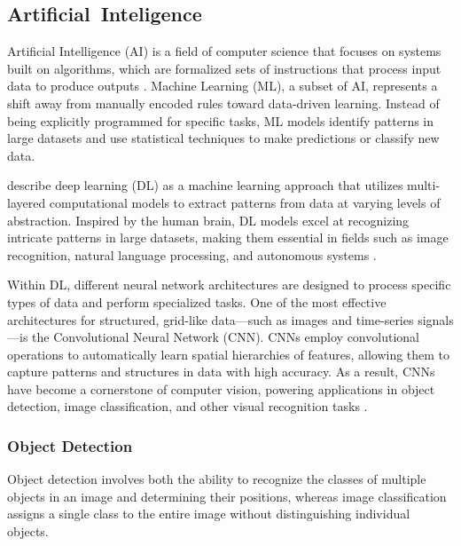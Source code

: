 \documentclass[a4paper,10pt,twocolumn]{article}
\numberwithin{figure}{section}
\numberwithin{table}{section}
\begin{document}

\subsection{\mbox{Artificial Inteligence}}
Artificial Intelligence (AI) is a field of computer science 
that focuses on systems built on algorithms, 
which are formalized sets of instructions that 
process input data to produce outputs \citep{10589380}. 
Machine Learning (ML), a subset of AI, represents a shift away 
from manually encoded rules toward data-driven learning. 
Instead of being explicitly programmed for specific tasks, 
ML models identify patterns in large datasets and 
use statistical techniques to make predictions or classify new data.

\cite{10589380} describe deep learning (DL) as a machine learning 
approach that utilizes multi-layered computational models to 
extract patterns from data at varying levels of abstraction. 
Inspired by the human brain, DL models excel at recognizing 
intricate patterns in large datasets, making them essential 
in fields such as image recognition, natural language processing, 
and autonomous systems \citep{SOORI202354}.

Within DL, different neural network architectures are designed to process
 specific types of data and perform specialized tasks. 
 One of the most effective architectures for structured, 
 grid-like data—such as images and time-series signals—is 
 the Convolutional Neural Network (CNN). 
 CNNs employ convolutional operations to automatically 
 learn spatial hierarchies of features, allowing them to 
 capture patterns and structures in data with high accuracy. 
 As a result, CNNs have become a cornerstone of computer vision, 
 powering applications in object detection, image classification, 
 and other visual recognition tasks \citep[pp. 326-328]{Goodfellow-et-al-2016}.

\vspace{0.3cm}
\subsubsection{Object Detection}
\vspace{0.3cm}
Object detection involves both the ability to recognize the classes of multiple objects in an image
and determining their positions, whereas image classification assigns a single 
class to the entire image without distinguishing individual objects.
\end{document}
